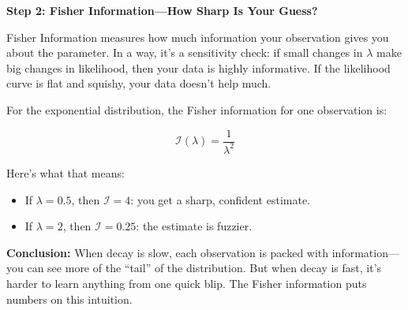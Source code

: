 \vspace{0.5em}
\noindent
\textbf{Step 2: Fisher Information—How Sharp Is Your Guess?}

Fisher Information measures how much information your observation gives you about the parameter. In a way, it’s a sensitivity check: if small changes in \( \lambda \) make big changes in likelihood, then your data is highly informative. If the likelihood curve is flat and squishy, your data doesn’t help much.

For the exponential distribution, the Fisher information for one observation is:

\[
\mathcal{I}(\lambda) = \frac{1}{\lambda^2}
\]

Here’s what that means:

\begin{itemize}
    \item If \( \lambda = 0.5 \), then \( \mathcal{I} = 4 \): you get a sharp, confident estimate.
    \item If \( \lambda = 2 \), then \( \mathcal{I} = 0.25 \): the estimate is fuzzier.
\end{itemize}

\vspace{0.5em}
\noindent
\textbf{Conclusion:} When decay is slow, each observation is packed with information—you can see more of the “tail” of the distribution. But when decay is fast, it’s harder to learn anything from one quick blip. The Fisher information puts numbers on this intuition.







